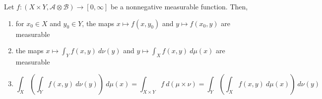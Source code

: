 \begin{theorem}[Fubini]
    Let $f: (X\times Y,\mathscr A\otimes\mathscr B)\to[0,\infty]$ be a nonnegative measurable function. Then, 
    \begin{enumerate}[label=(\alph*)]
    \item for $x_0\in X$ and $y_0\in Y$, the maps $x\mapsto f(x,y_0)$ and $y\mapsto f(x_0,y)$ are measurable 
    \item the maps $x\mapsto\int_Yf(x,y)~d\nu(y)$ and $y\mapsto\int_Xf(x,y)~d\mu(x)$ are measurable
    \item 
    \begin{equation*}
        \int_X\left(\int_Y f(x,y)~d\nu(y)\right)~d\mu(x) = \int_{X\times Y}f~d(\mu\times\nu) = \int_Y\left(\int_X f(x,y)~d\mu(x)\right)~d\nu(y)
    \end{equation*}
    \end{enumerate}
\end{theorem}

